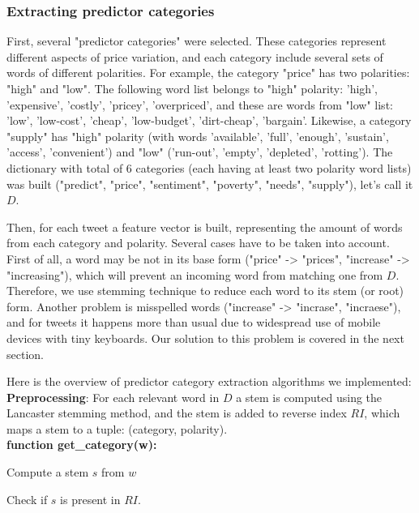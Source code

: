 \subsubsection*{Extracting predictor categories}

First, several "predictor categories" were selected. These categories represent different aspects of price variation, and each category include several sets of words of different polarities. For example, the category "price" has two polarities: "high" and "low". The following word list belongs to "high" polarity: 'high', 'expensive', 'costly', 'pricey', 'overpriced', and these are words from "low" list: 'low', 'low-cost', 'cheap', 'low-budget', 'dirt-cheap', 'bargain'. Likewise, a category "supply" has "high" polarity (with words 'available', 'full', 'enough', 'sustain', 'access', 'convenient') and "low" ('run-out', 'empty', 'depleted', 'rotting'). The dictionary with total of 6 categories (each having at least two polarity word lists) was built ("predict", "price", "sentiment", "poverty", "needs", "supply"), let's call it $D$.

Then, for each tweet a feature vector is built, representing the amount of words from each category and polarity. Several cases have to be taken into account. First of all, a word may be not in its base form ("price" -> "prices", "increase" -> "increasing"), which will prevent an incoming word from matching one from $D$. Therefore, we use stemming technique to reduce each word to its stem (or root) form. Another problem is misspelled words ("increase" -> "incrase", "incraese"), and for tweets it happens more than usual due to widespread use of mobile devices with tiny keyboards. Our solution to this problem is covered in the next section.

Here is the overview of predictor category extraction algorithms we implemented:\\

\textbf{Preprocessing}: For each relevant word in $D$ a stem is computed using the Lancaster stemming method, and the stem is added to reverse index $RI$, which maps a stem to a tuple: (category, polarity). \\

\textbf{function get\_category(w):} 

\indent
\begin{algorithm}[H]
Compute a stem $s$ from $w$ \par
Check if $s$ is present in $RI$. 

\end{algorithm}
\noindent


